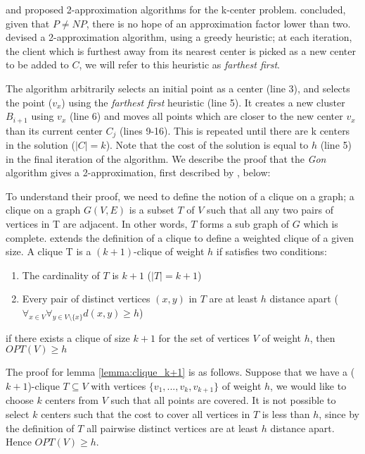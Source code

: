 \textcite{gonzalez_clustering_1985} and \textcite{hochbaum_best_1985} proposed 2-approximation algorithms for the k-center problem. \textcite{hochbaum_best_1985} concluded, given that $P\neq NP$, there is no hope of an approximation factor lower than two. \textcite{gonzalez_clustering_1985} devised a 2-approximation algorithm, using a greedy heuristic; at each iteration, the client which is furthest away from its nearest center is picked as a new center to be added to $C$, we will refer to this heuristic as \emph{farthest first}.



The algorithm arbitrarily selects an initial point as a center (line 3), and selects the point ($v_x$) using the \emph{farthest first} heuristic (line 5). It creates a new cluster $B_{i+1}$ using $v_x$ (line 6) and moves all points which are closer to the new center $v_x$ than its current center $C_j$ (lines 9-16). This is repeated until there are k centers in the solution ($|C| = k$). Note that the cost of the solution is equal to $h$ (line 5) in the final iteration of the algorithm. We describe the proof that the \emph{Gon} algorithm gives a 2-approximation, first described by \textcite{gonzalez_clustering_1985}, below:

To understand their proof, we need to define the notion of a clique on a graph; a clique on a graph $G(V, E)$ is a subset $T$ of $V$ such that all any two pairs of vertices in T are adjacent. In other words, $T$ forms a sub graph of $G$ which is complete. \textcite{gonzalez_clustering_1985} extends the definition of a clique to define a weighted clique of a given size. A clique T is a $(k+1)$-clique of weight $h$ if satisfies two conditions:
\begin{enumerate}
    \item The cardinality of $T$ is $k+1$ ($|T|=k+1$)
    \item Every pair of distinct vertices $(x,y)$ in $T$ are at least $h$ distance apart ($\forall _{x\in V}\forall _{y\in V\setminus \{x\}}d(x,y)\geq h$)
\end{enumerate}

\begin{lemma}\label{lemma:clique_k+1}
if there exists a clique of size $k+1$ for the set of vertices $V$ of weight $h$, then $OPT(V)\geq h$
\end{lemma} 

The proof for lemma \ref{lemma:clique_k+1} is as follows. Suppose that we have a ($k+1$)-clique $T\subseteq V$ with vertices $\{v_1, ...,v_k,v_{k+1}\}$ of weight $h$, we would like to choose $k$ centers from $V$ such that all points are covered. It is not possible to select $k$ centers such that the cost to cover all vertices in $T$ is less than $h$, since by the definition of $T$ all pairwise distinct vertices are at least $h$ distance apart. Hence $OPT(V)\geq h$.

